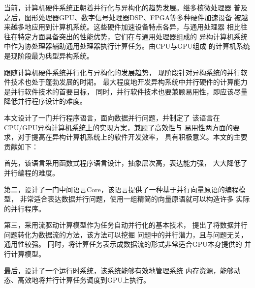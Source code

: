 \begin{cabstract}
当前，计算机硬件系统正朝着并行化与异构化的趋势发展。继多核微处理器
普及之后，图形处理器GPU、数字信号处理器DSP、FPGA等多种硬件加速设备
被越来越多地应用到计算机系统。这些硬件加速设备特点各异，与通用处理器
相比往往在特定方面具备突出的性能优势，它们在与通用处理器组成的
异构计算机系统中作为协处理器辅助通用处理器执行计算任务。由CPU与GPU组成
的计算机系统是现阶段最为典型异构系统。

跟随计算机硬件系统并行化与异构化的发展趋势，
现阶段针对异构系统的并行软件技术也处于蓬勃发展的时期。
最大程度地开发异构系统中并行硬件的计算能力是并行软件技术的首要目标，
同时，并行软件技术也要兼顾易用性，即应该尽量降低并行程序设计的难度。

本文设计了一门并行程序语言，面向数据并行问题，并制定了
该语言在CPU/GPU异构计算机系统上的实现方案，兼顾了高效性与
易用性两方面的要求，对于提高在异构计算机系统上的软件开发效率，
具有积极意义。本文的主要贡献如下：

首先，该语言采用函数式程序语言设计，抽象层次高，表达能力强，
大大降低了并行编程的难度。

第二，设计了一门中间语言Core，该语言提供了一种基于并行向量原语的编程模型，
非常适合表达数据并行问题，使用一组精简的向量原语就可以构造许多
实际的并行程序。

第三，采用流驱动计算模型作为任务自动并行化的基本技术，
提出了将数据并行问题转化为数据流的方法，该方法可以挖掘
问题中的并行潜力，且与问题无关，通用性较强。
同时，将计算任务表示成数据流的形式非常适合GPU本身提供的
并行计算模型。

最后，设计了一个运行时系统，该系统能够有效地管理系统
内存资源，能够动态、高效地将并行计算任务调度到GPU上执行。


\end{cabstract}


